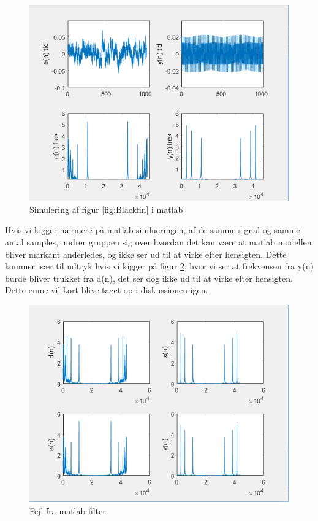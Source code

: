 \begin{figure}[H]
	\centering
	\includegraphics[width = 400pt]{Img/Blackfin_simulering}
	\caption{Simulering af figur \ref{fig:Blackfin} i matlab}
	\label{fig:Blackfin_simulering}
\end{figure}
\newpage
Hvis vi kigger nærmere på matlab simlueringen, af de samme signal og samme antal samples, undrer gruppen sig over hvordan det kan være at  matlab modellen bliver markant anderledes, og ikke ser ud til at virke efter hensigten. Dette kommer især til udtryk hvis vi kigger på figur \ref{fig:Tjek_af_frek}, hvor vi ser at frekvensen fra y(n) burde bliver trukket fra d(n), det ser dog ikke ud til at virke efter hensigten. Dette emne vil kort blive taget op i diskussionen igen. 
\begin{figure}[H]
	\centering
	\includegraphics[width = 400pt]{Img/Tjek_af_frek}
	\caption{Fejl fra matlab filter}
	\label{fig:Tjek_af_frek}
\end{figure}

